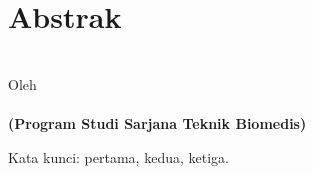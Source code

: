 \clearpage
\chapter*{Abstrak}

\begin{center}
	\linespread{1}
	\large{\bfseries{
			\MakeUppercase\thetitle
		}
	}\\[1\baselineskip]
	
	\normalsize{Oleh\\}
	\large{ 
		\bfseries \theauthor\\
		(Program Studi Sarjana Teknik Biomedis)
	}\\[2\baselineskip]
\end{center}

\medskip

\begin{spacing}{1.0}
	
	\blindtext
	
	\blindtext
	
	Kata kunci: pertama, kedua, ketiga.
	
\end{spacing}

\clearpage
